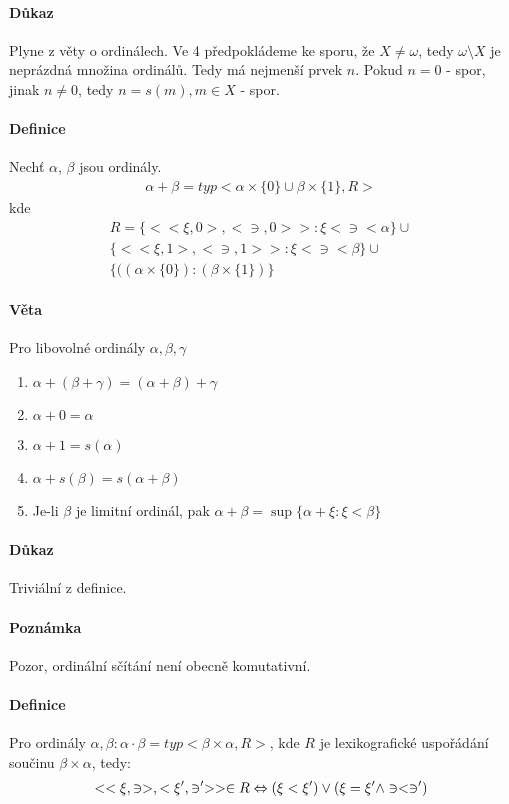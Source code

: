 \documentclass[a4paper,12pt,titlepage]{article}
\begin{document}
\paragraph{Důkaz}
Plyne z věty o ordinálech. Ve 4 předpokládeme ke sporu, že $X \neq \omega$, tedy
$\omega \setminus X$ je neprázdná množina ordinálů. Tedy má nejmenší prvek $n$.
Pokud $n = 0$ - spor, jinak $n \neq 0$, tedy $n = s(m), m \in X$ - spor.
\paragraph{Definice}
Nechť $\alpha$, $\beta$ jsou ordinály.
\begin{align}
	\alpha + \beta = typ<\alpha \times \{0\} \cup \beta \times \{1\}, R>
\end{align}
kde
\begin{align}
	R = \{ << \xi, 0>, <\ni,0>> : \xi < \ni < \alpha \} \cup \\
	\{<<\xi, 1>,<\ni,1>> : \xi < \ni < \beta \} \cup \\
	\{((\alpha\times\{0\}): (\beta\times\{1\})\}
\end{align}
\paragraph{Věta}
Pro libovolné ordinály $\alpha, \beta, \gamma$
\begin{enumerate}
	\item $\alpha + (\beta + \gamma) = (\alpha + \beta) + \gamma$
	\item $\alpha + 0 = \alpha$
	\item $\alpha + 1 = s(\alpha)$
	\item $\alpha + s(\beta) = s(\alpha + \beta)$
	\item Je-li $\beta$ je limitní ordinál, pak $\alpha + \beta = \sup\{\alpha +
	\xi : \xi < \beta \}$
\end{enumerate}
\paragraph{Důkaz}
Triviální z definice.
\paragraph{Poznámka}
Pozor, ordinální sčítání není obecně komutativní.
\paragraph{Definice}
Pro ordinály $\alpha, \beta: \alpha \cdot \beta = typ < \beta \times \alpha,
R>$, kde $R$ je lexikografické uspořádání součinu $\beta\times\alpha$, tedy:
\begin{align}
	<<\xi,\ni>, <\xi',\ni'>> \in R \Leftrightarrow (\xi < \xi') \lor (\xi = \xi' \land \ni <
	\ni')
\end{align}
\end{document}
